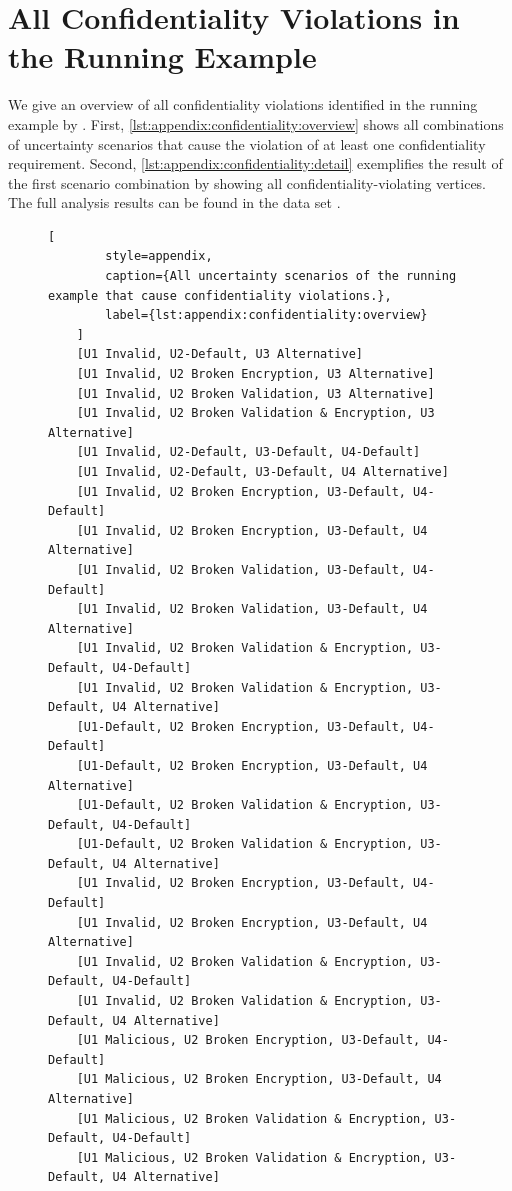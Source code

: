 \chapter{All Confidentiality Violations in the Running Example}%
\label{sec:appendix:confidentiality}

We give an overview of all confidentiality violations identified in the running example by \abunai.
First, \autoref{lst:appendix:confidentiality:overview} shows all combinations of uncertainty scenarios that cause the violation of at least one confidentiality requirement.
Second, \autoref{lst:appendix:confidentiality:detail} exemplifies the result of the first scenario combination by showing all confidentiality-violating vertices.
The full analysis results can be found in the data set \cite{dataset}.

\begin{figure}
    \begin{lstlisting}[
        style=appendix,
        caption={All uncertainty scenarios of the running example that cause confidentiality violations.},
        label={lst:appendix:confidentiality:overview}
    ]
    [U1 Invalid, U2-Default, U3 Alternative]
    [U1 Invalid, U2 Broken Encryption, U3 Alternative]
    [U1 Invalid, U2 Broken Validation, U3 Alternative] 
    [U1 Invalid, U2 Broken Validation & Encryption, U3 Alternative]
    [U1 Invalid, U2-Default, U3-Default, U4-Default]
    [U1 Invalid, U2-Default, U3-Default, U4 Alternative]
    [U1 Invalid, U2 Broken Encryption, U3-Default, U4-Default]
    [U1 Invalid, U2 Broken Encryption, U3-Default, U4 Alternative]
    [U1 Invalid, U2 Broken Validation, U3-Default, U4-Default]
    [U1 Invalid, U2 Broken Validation, U3-Default, U4 Alternative]
    [U1 Invalid, U2 Broken Validation & Encryption, U3-Default, U4-Default]
    [U1 Invalid, U2 Broken Validation & Encryption, U3-Default, U4 Alternative]
    [U1-Default, U2 Broken Encryption, U3-Default, U4-Default]
    [U1-Default, U2 Broken Encryption, U3-Default, U4 Alternative]
    [U1-Default, U2 Broken Validation & Encryption, U3-Default, U4-Default]
    [U1-Default, U2 Broken Validation & Encryption, U3-Default, U4 Alternative]
    [U1 Invalid, U2 Broken Encryption, U3-Default, U4-Default]
    [U1 Invalid, U2 Broken Encryption, U3-Default, U4 Alternative]
    [U1 Invalid, U2 Broken Validation & Encryption, U3-Default, U4-Default]
    [U1 Invalid, U2 Broken Validation & Encryption, U3-Default, U4 Alternative]
    [U1 Malicious, U2 Broken Encryption, U3-Default, U4-Default]
    [U1 Malicious, U2 Broken Encryption, U3-Default, U4 Alternative]
    [U1 Malicious, U2 Broken Validation & Encryption, U3-Default, U4-Default]
    [U1 Malicious, U2 Broken Validation & Encryption, U3-Default, U4 Alternative]
    \end{lstlisting}
\end{figure}

